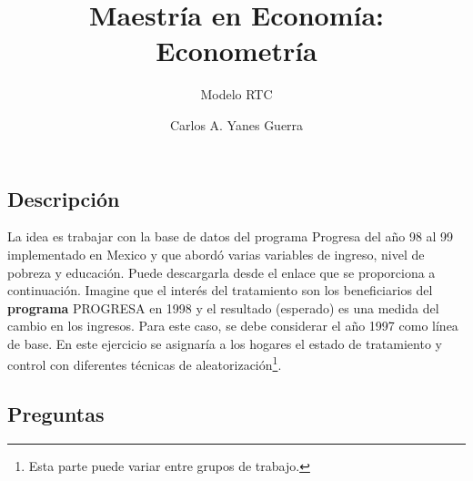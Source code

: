 \documentclass[
]{article}
\title{Maestría en Economía: Econometría}
\subtitle{Modelo RTC}
\author[]{Carlos A. Yanes
Guerra}
\affil{Universidad
del Norte \textbar{} Departamento de Economía}
\date{}
\begin{document}
\maketitle

{
\hypersetup{linkcolor=}
\setcounter{tocdepth}{3}
\tableofcontents
}
\subsection{Descripción}\label{descripciuxf3n}

La idea es trabajar con la base de datos del programa Progresa del año
98 al 99 implementado en Mexico y que abordó varias variables de
ingreso, nivel de pobreza y educación. Puede descargarla desde el enlace
que se proporciona a continuación. Imagine que el interés del
tratamiento son los beneficiarios del \textbf{programa} PROGRESA en 1998
y el resultado (esperado) es una medida del cambio en los ingresos. Para
este caso, se debe considerar el año 1997 como línea de base. En este
ejercicio se asignaría a los hogares el estado de tratamiento y control
con diferentes técnicas de
aleatorización\footnote{Esta parte puede variar entre grupos de trabajo.}.

\subsection{Preguntas}\label{preguntas}
\end{document}
